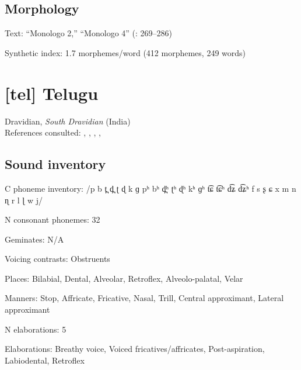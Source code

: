 {\subsection*{Morphology}

\begin{appendixdesc}

\item[Text:] “Monologo 2,” “Monologo 4” (\citealt{FernándezGarayHernández2006}: 269--286)

\item[Synthetic index:] 1.7 morphemes/word (412 morphemes, 249 words)
\end{appendixdesc}

\section*{[tel] Telugu}  %
Dravidian, \textit{South Dravidian} (India)\medskip\\
References consulted: \citet{BhaskararaoRay2017}, \citet{Kelley1963}, \citet{KostićEtAl1977}, \citet{Krishnamurti1998}, \citet{Sailaja1999}

\subsection*{Sound inventory}
\begin{appendixdesc}

\item[C phoneme inventory:] /p b t̪ d̪ ʈ ɖ k ɡ pʰ bʰ d̪ʰ ʈʰ ɖʰ kʰ ɡʰ t͡ɕ t͡ɕʰ d͡ʑ d͡ʑʰ f s ʂ ɕ x m n ɳ r l ɭ w j/

\item[N consonant phonemes:] 32

\item[Geminates:] N/A

\item[Voicing contrasts:] Obstruents

\item[Places:] Bilabial, Dental, Alveolar, Retroflex, Alveolo-palatal, Velar

\item[Manners:] Stop, Affricate, Fricative, Nasal, Trill, Central approximant, Lateral approximant

\item[N elaborations:] 5

\item[Elaborations:] Breathy voice, Voiced fricatives/affricates, Post-aspiration, Labiodental, Retroflex


\end{appendixdesc}}
